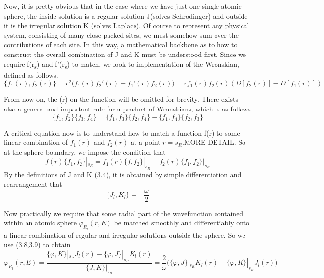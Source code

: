 \documentclass[12pt]{article}
\begin{document}
Now, it is pretty obvious that in the case where we have just one single atomic sphere, the inside solution is a regular solution J(solves Schrodinger) and outside it is the irregular solution K (solves Laplace). 
Of course to represent any physical system, consisting of many close-packed sites, we must somehow sum over the contributions of each site. In this way, a mathematical backbone as to how to construct the overall combination of J and K must be understood first.
Since we require f(r\textsubscript{s}) and f'(r\textsubscript{s}) to match, we look to implementation of the Wronskian, defined as follows.
\begin{equation} \label{3.6} \tag{3.6}
\{f_1(r),f_2(r)\}= r^2 \big(f_1(r)f_2'(r)-f_1'(r)f_2(r)\big)=rf_1(r)f_2(r) (D[f_2(r)]-D[f_1(r)])
\end{equation}

From now on, the (r) on the function will be omitted for brevity. There exists also a general and important rule for a product of Wronskians, which is as follows
\begin{equation} \label{3.7} \tag{3.7}
\{f_1,f_2\}\{f_3,f_4\}=\{f_1,f_3\}\{f_2,f_4\}-\{f_1,f_4\}\{f_2,f_3\}
\end{equation}

A critical equation now is to understand how to match a function f(r) to some linear combination of $f_1(r)$ and $f_2(r)$ at a point $r=s_R$.MORE DETAIL. So at the sphere boundary, we impose the condition that
\begin{equation} \label{3.8} \tag{3.8}
f(r)\{f_1,f_2\}|_{s_R}=f_1(r)\{f,f_2\}|_{s_R}-f_2(r)\{f_1,f_2\}|_{s_R}
\end{equation}
By the definitions of J and K (3.4), it is obtained by simple differentiation and rearrangement that 
\begin{equation} \label{3.9} \tag{3.9}
\{J_l,K_l\}=-\frac{\omega}{2}
\end{equation}

Now practically we require that some radial part of the wavefunction contained within an atomic sphere $\varphi_R_l(r,E)$ be matched smoothly and differentiably onto a linear combination of regular and irregular solutions outside the sphere. So we use (3.8,3.9) to obtain
\begin{equation} \label{3.10} \tag{3.10}
\varphi_R_l(r,E)=\frac{\{\varphi,K\}|_{s_R}J_l(r)-\{\varphi,J\}|_{s_R}K_l(r)}{\{J,K\}|_{s_R}}=\frac{2}{\omega}\bigg(\{\varphi,J\}|_{s_R}K_l(r)-\{\varphi,K\}|_{s_R}J_l(r)\bigg)
\end{equation}
\end{document}
